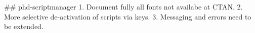 ## phd-scriptmanager
1.  Document fully all fonts not availabe at CTAN.
2.  More selective de-activation of scripts via keys.
3.  Messaging and errors need to be extended.



